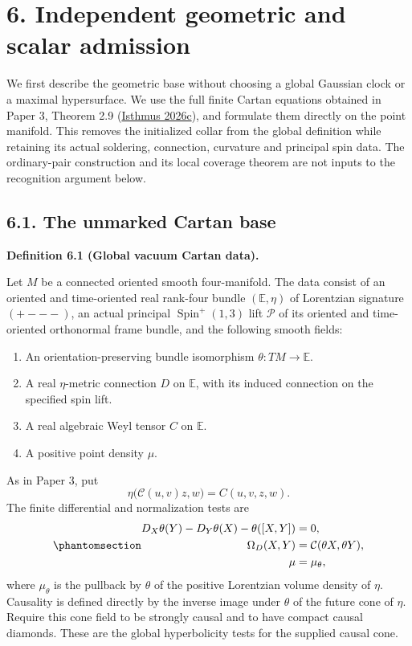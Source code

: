 \documentclass[
  english,
  11pt,
  reqno]{amsart}
\makeatletter
\providecommand{\tightlist}{%
  \setlength{\itemsep}{0pt}\setlength{\parskip}{0pt}}
\newcommand{\paperdisplaynext}{%
  \let\paper@savedstartsection\@startsection
  \def\@startsection##1##2##3##4##5##6{%
    \let\@startsection\paper@savedstartsection
    \@tempskipa ##5\relax
    \ifdim\@tempskipa<\z@
      \def\paper@afterskip{.35\baselineskip}%
    \else
      \def\paper@afterskip{##5}%
    \fi
    \@startsection{##1}{##2}{##3}{##4}{\paper@afterskip}{##6}}}
\newcommand{\paperdisplaysection}{\paperdisplaynext\subsection}
\newcommand{\pandocstatementheading}[1]{%
  \par\if@nobreak\else
    \addpenalty{\@beginparpenalty}%
    \addvspace{.5\baselineskip plus .2\baselineskip minus .2\baselineskip}%
  \fi
  {\normalfont\bfseries #1\par}%
  \nobreak\@afterindenttrue\@afterheading
}
\makeatother
\begin{document}
\protect{}\label{sec:global-independent-geometric-admission}

\section{6. Independent geometric and scalar
admission}\label{independent-geometric-and-scalar-admission}

We first describe the geometric base without choosing a global Gaussian
clock or a maximal hypersurface. We use the full finite Cartan equations
obtained in Paper 3, Theorem 2.9
(\hyperref[ref-IsthmusSmooth2026]{Isthmus 2026c}), and formulate them
directly on the point manifold. This removes the initialized collar from
the global definition while retaining its actual soldering, connection,
curvature and principal spin data. The ordinary-pair construction and
its local coverage theorem are not inputs to the recognition argument
below.

\protect{}\label{sec:global-cartan-base}
\paperdisplaysection{6.1. The unmarked Cartan
base}\label{the-unmarked-cartan-base}
\pandocstatementheading{\protect{}\label{def:global-cartan-base}Definition 6.1 (Global vacuum Cartan data).}

Let \(M\) be a connected oriented smooth four-manifold. The data consist
of an oriented and time-oriented real rank-four bundle
\((\mathbb E,\eta)\) of Lorentzian signature \((+---)\), an actual
principal \(\operatorname{Spin}^+(1,3)\) lift \(\mathcal P\) of its
oriented and time-oriented orthonormal frame bundle, and the following
smooth fields:

\begin{enumerate}
\tightlist
\item
  An orientation-preserving bundle isomorphism
  \(\theta:TM\to\mathbb E\).
\item
  A real \(\eta\)-metric connection \(D\) on \(\mathbb E\), with its
  induced connection on the specified spin lift.
\item
  A real algebraic Weyl tensor \(C\) on \(\mathbb E\).
\item
  A positive point density \(\mu\).
\end{enumerate}

As in Paper 3, put \[
\eta\bigl(\mathcal C(u,v)z,w\bigr)=C(u,v,z,w).
\] The finite differential and normalization tests are
\begin{equation}\protect\phantomsection\label{eq:global-cartan-admission}{
\begin{aligned}
D_X\theta(Y)-D_Y\theta(X)-\theta([X,Y])&=0,\\
\Omega_D(X,Y)&=\mathcal C(\theta X,\theta Y),\\
\mu&=\mu_\theta,
\end{aligned}
}\end{equation} where \(\mu_\theta\) is the pullback by \(\theta\) of
the positive Lorentzian volume density of \(\eta\). Causality is defined
directly by the inverse image under \(\theta\) of the future cone of
\(\eta\). Require this cone field to be strongly causal and to have
compact causal diamonds. These are the global hyperbolicity tests for
the supplied causal cone.
\end{document}
